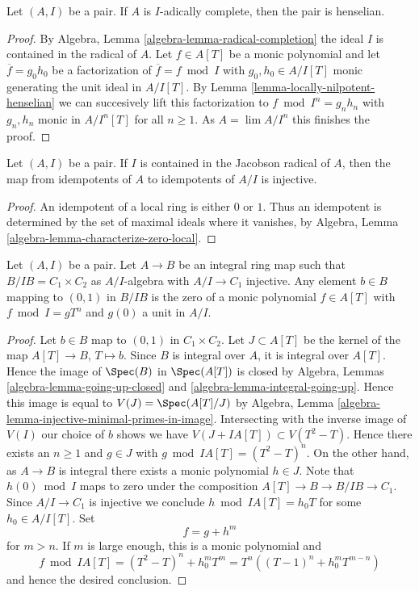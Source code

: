\begin{lemma}
\label{lemma-complete-henselian}
Let $(A, I)$ be a pair. If $A$ is $I$-adically complete, then
the pair is henselian.
\end{lemma}

\begin{proof}
By Algebra, Lemma \ref{algebra-lemma-radical-completion}
the ideal $I$ is contained in the radical of $A$.
Let $f \in A[T]$ be a monic polynomial and let
$\overline{f} = g_0h_0$ be a factorization
of $\overline{f} = f \bmod I$ with $g_0, h_0 \in A/I[T]$ monic
generating the unit ideal in $A/I[T]$. By
Lemma \ref{lemma-locally-nilpotent-henselian}
we can succesively lift this factorization to
$f \bmod I^n = g_n h_n$ with $g_n, h_n$ monic
in $A/I^n[T]$ for all $n \geq 1$.
As $A = \lim A/I^n$ this finishes the proof.
\end{proof}

\begin{lemma}
\label{lemma-idempotents-determined-modulo-radical}
Let $(A, I)$ be a pair. If $I$ is contained in the Jacobson radical
of $A$, then the map from idempotents of $A$ to idempotents of
$A/I$ is injective.
\end{lemma}

\begin{proof}
An idempotent of a local ring is either $0$ or $1$.
Thus an idempotent is determined by the set of maximal ideals
where it vanishes, by
Algebra, Lemma \ref{algebra-lemma-characterize-zero-local}.
\end{proof}

\begin{lemma}
\label{lemma-helper-integral}
Let $(A, I)$ be a pair. Let $A \to B$ be an integral ring map
such that $B/IB = C_1 \times C_2$ as $A/I$-algebra with $A/I \to C_1$
injective. Any element $b \in B$ mapping to $(0, 1)$ in $B/IB$
is the zero of a monic polynomial $f \in A[T]$
with $f \bmod I = g T^n$ and $g(0)$ a unit in $A/I$.
\end{lemma}

\begin{proof}
Let $b \in B$ map to $(0, 1)$ in $C_1 \times C_2$.
Let $J \subset A[T]$ be the kernel of the map $A[T] \to B$, $T \mapsto b$.
Since $B$ is integral over $A$, it is integral over $A[T]$. Hence
the image of $\Spec(B)$ in $\Spec(A[T])$ is closed by
Algebra, Lemmas \ref{algebra-lemma-going-up-closed} and
\ref{algebra-lemma-integral-going-up}. Hence this image is
equal to $V(J) = \Spec(A[T]/J)$ by
Algebra, Lemma \ref{algebra-lemma-injective-minimal-primes-in-image}.
Intersecting with the inverse image of $V(I)$ our choice of $b$ shows
we have $V(J + IA[T]) \subset V(T^2 - T)$. Hence there exists an $n \geq 1$
and $g \in J$ with $g \bmod IA[T] = (T^2 - T)^n$.
On the other hand, as $A \to B$ is integral there exists a monic
polynomial $h \in J$. Note that $h(0) \bmod I$ maps to zero
under the composition $A[T] \to B \to B/IB \to C_1$. Since $A/I \to C_1$
is injective we conclude $h \bmod IA[T] = h_0 T$ for some $h_0 \in A/I[T]$.
Set
$$
f = g + h^m
$$
for $m > n$. If $m$ is large enough, this is a monic polynomial and
$$
f \bmod IA[T] = (T^2 - T)^n + h_0^m T^m =
T^n((T - 1)^n + h_0^m T^{m - n})
$$
and hence the desired conclusion.
\end{proof}

